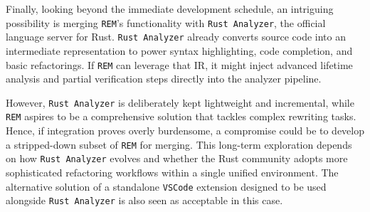 Finally, looking beyond the immediate development schedule, an intriguing
possibility is merging \texttt{REM}’s functionality with \texttt{Rust Analyzer},
the official language server for Rust. \texttt{Rust Analyzer} already converts
source code into an intermediate representation to power syntax highlighting,
code completion, and basic refactorings. If \texttt{REM} can leverage that IR,
it might inject advanced lifetime analysis and partial verification steps
directly into the analyzer pipeline.

However, \texttt{Rust Analyzer} is deliberately kept lightweight and
incremental, while \texttt{REM} aspires to be a comprehensive solution that
tackles complex rewriting tasks. Hence, if integration proves overly burdensome,
a compromise could be to develop a stripped-down subset of \texttt{REM} for
merging. This long-term exploration depends on how \texttt{Rust Analyzer}
evolves and whether the Rust community adopts more sophisticated refactoring
workflows within a single unified environment. The alternative solution of a
standalone \texttt{VSCode} extension designed to be used alongside \texttt{Rust
Analyzer} is also seen as acceptable in this case.
